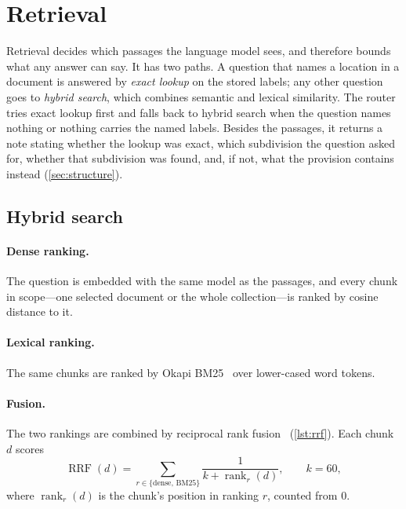 \section{Retrieval}
\label{sec:retrieval}

Retrieval decides which passages the language model sees, and therefore bounds
what any answer can say. It has two paths. A question that names a location in
a document is answered by \emph{exact lookup} on the stored labels; any other
question goes to \emph{hybrid search}, which combines semantic and lexical
similarity. The router tries exact lookup first and falls back to hybrid search
when the question names nothing or nothing carries the named labels. Besides
the passages, it returns a note stating whether the lookup was exact, which
subdivision the question asked for, whether that subdivision was found, and,
if not, what the provision contains instead (\cref{sec:structure}).

\subsection{Hybrid search}

\paragraph{Dense ranking.} The question is embedded with the same model as the
passages, and every chunk in scope---one selected document or the whole
collection---is ranked by cosine distance to it.

\paragraph{Lexical ranking.} The same chunks are ranked by Okapi
BM25~\cite{robertson2009bm25} over lower-cased word tokens.

\paragraph{Fusion.} The two rankings are combined by reciprocal rank
fusion~\cite{cormack2009rrf} (\cref{lst:rrf}). Each chunk $d$ scores
\begin{equation}
  \operatorname{RRF}(d) = \sum_{r \in \{\mathrm{dense},\, \mathrm{BM25}\}}
  \frac{1}{k + \operatorname{rank}_r(d)}, \qquad k = 60,
\end{equation}
where $\operatorname{rank}_r(d)$ is the chunk's position in ranking $r$,
counted from 0.

